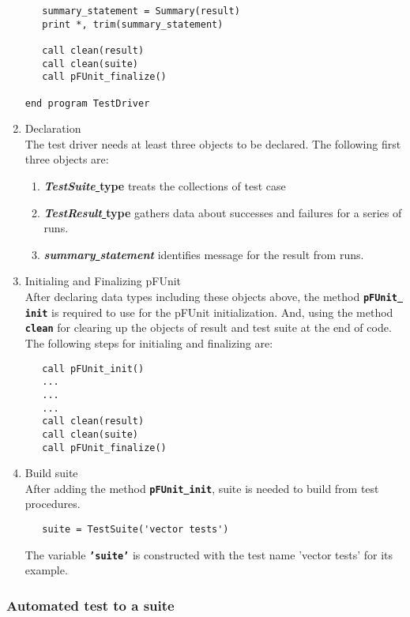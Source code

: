 \documentclass[10pt]{article}
\newcommand{\pfunit}{{\sc pFUnit }}
\begin{document}
\begin{enumerate}
\begin{verbatim}
   summary_statement = Summary(result)
   print *, trim(summary_statement)

   call clean(result)
   call clean(suite)
   call pFUnit_finalize()
  
end program TestDriver
\end{verbatim}

\item Declaration \\
The test driver needs at least three objects to be declared.   The following first three objects are:

\begin{enumerate}
\item \textbf{\emph{TestSuite}\underline{ }type} treats the collections of test case
\item \textbf{\emph{TestResult}\underline{ }type} gathers data about successes and failures for a series of runs.
\item \textbf{\emph{summary\underline{ }statement}} identifies message for the result from runs.  
\end{enumerate}

\item Initialing and Finalizing \pfunit \\
After declaring data types including these objects above, the method \textbf{\texttt{pFUnit\underline{ }init}} is required to use for the pFUnit initialization.  And, using the method \textbf{\texttt{clean}} for clearing up the objects of result and test suite at the end of code.    The following steps for initialing and finalizing are:
\begin{verbatim}
   call pFUnit_init()
   ...
   ...
   ...
   call clean(result)
   call clean(suite)
   call pFUnit_finalize()
\end{verbatim}

\item Build suite \\
After adding the method  \textbf{\texttt{pFUnit\underline{ }init}}, suite is needed to build from test procedures.

\begin{verbatim}
   suite = TestSuite('vector tests')
\end{verbatim}

The variable \textbf{\texttt{'suite'}} is constructed with the test name 'vector tests' for its example.

\end{enumerate}


\subsubsection{Automated test to a suite}
\end{document}
